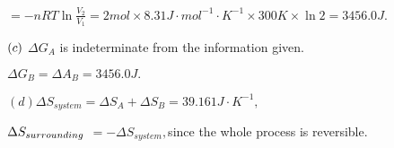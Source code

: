 \documentclass{article}
\begin{document}
$=-nRT\ln \frac{V_{2}}{V_{1}}=2\unit{mol}\times 8.31\unit{J}\cdot \unit{mol}%
^{-1}\cdot \unit{K}^{-1}\times 300\unit{K}\times \ln 2=\allowbreak 3456.0%
\unit{J}.$

$\bigskip \left( c\right) $ $\Delta G_{A}$ is indeterminate from the
information given. 

$\Delta G_{B}=\Delta A_{B}=\allowbreak 3456.0\unit{J}.$

$\left( d\right) \Delta S_{system}=\Delta S_{A}+\Delta S_{B}=39.161\unit{J}%
\cdot \unit{K}^{-1},$

$\bigskip \Delta S_{surrounding}$ $=-\Delta S_{system},$since the whole
process is reversible.
\end{document}
